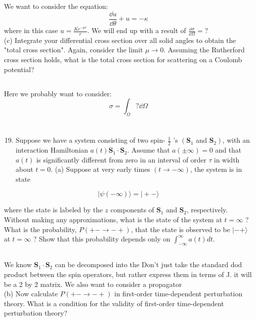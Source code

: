 \documentclass[12pt]{article}
\begin{document}
\subsection{}
We want to consider the equation:
\begin{equation}
  \frac{\dd{ u}}{\dd{\theta }} +u = - \kappa 
\end{equation}
where in this case $u= \frac{Ke^{-\mu r }}{r}$. We will end up with a result of $\frac{\dd{\sigma }}{\dd{\Omega }}=?$\\
(c) Integrate your differential cross section over all solid angles to obtain the "total cross section". Again, consider the limit $\mu \rightarrow 0$. Assuming the Rutherford cross section holds, what is the total cross section for scattering on a Coulomb potential?
\subsection{}
Here we probably want to consider:
\begin{equation}
  \sigma = \int_{\Omega }? \dd{\Omega } 
\end{equation}
\section{}
\begin{enumerate}
  \setcounter{enumi}{18}
  \item Suppose we have a system consisting of two spin- $\frac{1}{2}$ 's $\left(\mathbf{S}_{1}\right.$ and $\left.\mathbf{S}_{2}\right)$, with an interaction Hamiltonian $a(t) \mathbf{S}_{1} \cdot \mathbf{S}_{2}$. Assume that $a( \pm \infty)=0$ and that $a(t)$ is significantly different from zero in an interval of order $\tau$ in width about $t=0$.
(a) Suppose at very early times $(t \rightarrow-\infty)$, the system is in state
\end{enumerate}

$$
|\psi(-\infty)\rangle=|+-\rangle
$$

where the state is labeled by the $z$ components of $\mathbf{S}_{1}$ and $\mathbf{S}_{2}$, respectively. Without making any approximations, what is the state of the system at $t=\infty$ ? What is the probability, $P(+-\rightarrow-+)$, that the state is observed to be $|-+\rangle$ at $t=\infty$ ? Show that this probability depends only on $\int_{-\infty}^{\infty} a(t) d t$.
\subsection{}
We know $\mathbf{S}_{1} \cdot \mathbf{S}_{2}$ can be decomposed into the 
Don't just take the standard dod product between the spin operators, but rather express them in terms of J. it will be a 2 by 2 matrix. We also want to consider a propagator\\
(b) Now calculate $P(+-\rightarrow-+)$ in first-order time-dependent perturbation theory. What is a condition for the validity of first-order time-dependent perturbation theory?
\end{document}
